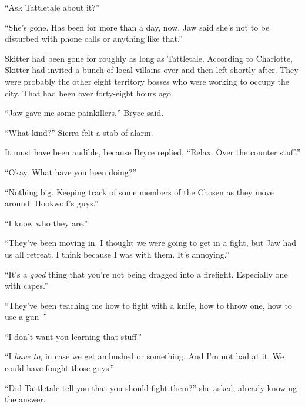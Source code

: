 ``Ask Tattletale about it?''



``She's gone.  Has been for more than a day, now.  Jaw said she's not to be disturbed with phone calls or anything like that.''



Skitter had been gone for roughly as long as Tattletale.  According to Charlotte, Skitter had invited a bunch of local villains over and then left shortly after.  They were probably the other eight territory bosses who were working to occupy the city.  That had been over forty-eight hours ago.



``Jaw gave me some painkillers,'' Bryce said.



``What kind?''  Sierra felt a stab of alarm.



It must have been audible, because Bryce replied, ``Relax.  Over the counter stuff.''



``Okay.  What have you been doing?''



``Nothing big.  Keeping track of some members of the Chosen as they move around.  Hookwolf's guys.''



``I know who they are.''



``They've been moving in.  I thought we were going to get in a fight, but Jaw had us all retreat.  I think because I was with them.  It's annoying.''



``It's a \emph{good} thing that you're not being dragged into a firefight.  Especially one with capes.''



``They've been teaching me how to fight with a knife, how to throw one, how to use a gun--''



``I don't want you learning that stuff.''



``I \emph{have to}, in case we get ambushed or something.  And I'm not bad at it.  We could have fought those guys.''



``Did Tattletale tell you that you should fight them?'' she asked, already knowing the answer.



